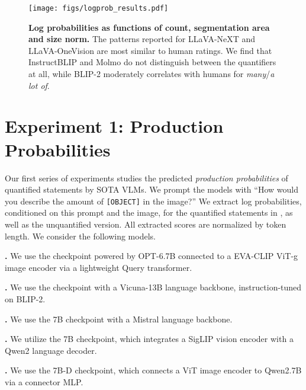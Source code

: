 \begin{figure*}[h]
    \centering
    \texttt{[image: figs/logprob\_results.pdf]}
    \caption{\textbf{Log probabilities as functions of count, segmentation area and size norm.} The patterns reported for LLaVA-NeXT and LLaVA-OneVision are most similar to human ratings. We find that InstructBLIP and Molmo do not distinguish between the quantifiers at all, while BLIP-2 moderately correlates with humans for \textit{many}/\textit{a lot of}.}
    \label{fig:exp1_logprobs}
\end{figure*}

\section{Experiment 1: Production Probabilities}\label{sec:logprobs}
Our first series of experiments studies the predicted \emph{production probabilities} of quantified statements by SOTA VLMs. We prompt the models with 
``How would you describe the amount of \verb|[OBJECT]| in the image?''
We extract log probabilities, conditioned on this prompt and the image, 
for the quantified statements in \dataset, as well as the unquantified version.
All extracted scores are normalized by token length. We consider the following models.

\begin{description}

    \item[BLIP-2]\citep{li2023-blip2}\textbf{.} We use the checkpoint powered by OPT-6.7B \citep{zhang2022-opt} connected to a EVA-CLIP ViT-g \citep{radford2021-clip, fang2023-eva} image encoder via a lightweight Query transformer. 
    
    \item[InstructBLIP]\citep{dai2023-instructblip}\textbf{.} We use the checkpoint with a Vicuna-13B \citep{zheng2023-vicuna} language backbone, instruction-tuned on BLIP-2.

    \item[LLaVA-NeXT]\citep{liu2024-llavanext}\textbf{.} 
    We use the 7B checkpoint with a Mistral \citep{jiang2023-mistral} language backbone.

    \item[LLaVA-OneVision]\citep{li2024-llavaov}\textbf{.} We utilize the 7B checkpoint, which integrates a SigLIP \citep{zhai2023-siglip} vision encoder with a Qwen2 \citep{yang2024-qwen2} language decoder. 
     
    \item[Molmo]\citep{deitke2024-molmo}\textbf{.} We use the 7B-D checkpoint, which connects a ViT image encoder to Qwen2.7B via a connector MLP.
\end{description}

